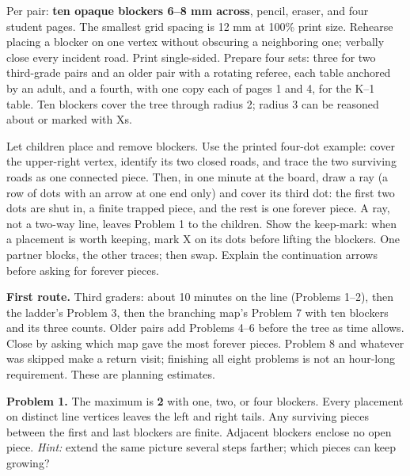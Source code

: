 \documentclass[11pt,letterpaper]{article}
\newcommand{\heading}[1]{\par\vspace{5pt}{\large\bfseries #1}\par}
\begin{document}
\heading{Preparation and common launch}
Per pair: \textbf{ten opaque blockers 6--8 mm across}, pencil, eraser, and four student pages. The smallest grid spacing is 12 mm at 100\% print size. Rehearse placing a blocker on one vertex without obscuring a neighboring one; verbally close every incident road. Print single-sided. Prepare four sets: three for two third-grade pairs and an older pair with a rotating referee, each table anchored by an adult, and a fourth, with one copy each of pages 1 and 4, for the K--1 table. Ten blockers cover the tree through radius 2; radius 3 can be reasoned about or marked with Xs.

Let children place and remove blockers. Use the printed four-dot example: cover the upper-right vertex, identify its two closed roads, and trace the two surviving roads as one connected piece. Then, in one minute at the board, draw a ray (a row of dots with an arrow at one end only) and cover its third dot: the first two dots are shut in, a finite trapped piece, and the rest is one forever piece. A ray, not a two-way line, leaves Problem 1 to the children. Show the keep-mark: when a placement is worth keeping, mark X on its dots before lifting the blockers. One partner blocks, the other traces; then swap. Explain the continuation arrows before asking for forever pieces.

\textbf{First route.} Third graders: about 10 minutes on the line (Problems 1--2), then the ladder's Problem 3, then the branching map's Problem 7 with ten blockers and its three counts. Older pairs add Problems 4--6 before the tree as time allows. Close by asking which map gave the most forever pieces. Problem 8 and whatever was skipped make a return visit; finishing all eight problems is not an hour-long requirement. These are planning estimates.

\heading{Numbered answers and hints}
\textbf{Problem 1.} The maximum is \textbf{2} with one, two, or four blockers. Every placement on distinct line vertices leaves the left and right tails. Any surviving pieces between the first and last blockers are finite. Adjacent blockers enclose no open piece. \emph{Hint:} extend the same picture several steps farther; which pieces can keep growing?
\end{document}
